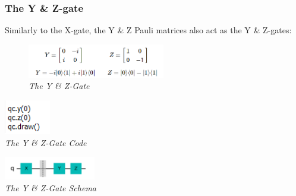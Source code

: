 \documentclass{article}
\begin{document}
\subsubsection{The Y \& Z-gate }
Similarly to the X-gate, the Y \& Z Pauli matrices also act as the Y \& Z-gates:
\begin{figure}[h]
\begin{center}
\begin{minipage}[b]{4cm}
\centering
\includegraphics[width=6cm]{yandz_gate.png}\\\textit{The Y \& Z-Gate}
\end{minipage}
\end{center}
\end{figure}
\begin{mdframed}
\begin{center}
\begin{minipage}[b]{4cm}
\centering
\includegraphics[width=2cm]{yandz_code.png}\\\textit{The Y \& Z-Gate Code}
\end{minipage}
\begin{minipage}[b]{4cm}
\centering
\includegraphics[width=4cm]{yandz_gate_schema.png}\\\textit{The Y \& Z-Gate Schema}
\end{minipage}
\end{center}
\end{mdframed}
\end{document}
